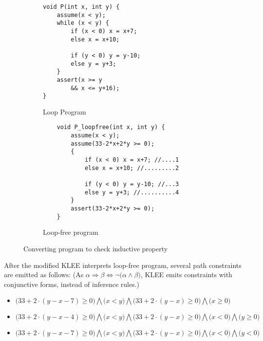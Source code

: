 \begin{figure}[!h]
\begin{subfigure}{0.20\textwidth}
    \centering
    {\scriptsize\begin{verbatim}
void P(int x, int y) {
    assume(x < y);
    while (x < y) {
        if (x < 0) x = x+7;
        else x = x+10;
    
        if (y < 0) y = y-10;
        else y = y+3; 
    }
    assert(x >= y
        && x <= y+16);
}
    \end{verbatim}}
    \vspace{-5mm}
    \caption{Loop Program}
    \label{fig:klee:program:in}
\end{subfigure}%
\begin{subfigure}{.20\textwidth}
      \centering
      \vspace{-0.1cm}
        {\scriptsize\begin{verbatim}
    void P_loopfree(int x, int y) {
        assume(x < y);
        assume(33-2*x+2*y >= 0);
        {
            if (x < 0) x = x+7; //....1
            else x = x+10; //.........2
    
            if (y < 0) y = y-10; //...3
            else y = y+3; //..........4
        }
        assert(33-2*x+2*y >= 0);
    }
    \end{verbatim}}
    \vspace{-5mm}
    \caption{Loop-free program}
      \label{fig:klee:program:out}
\end{subfigure}
\caption{Converting program to check inductive property}
\label{fig:klee:program}
\end{figure}

After the modified KLEE interprets loop-free program,
several path constraints are emitted as follows:
(As $\alpha \Rightarrow \beta \Longleftrightarrow \neg \big(\alpha \wedge \beta\big)$, 
KLEE emits constraints with conjunctive forms, instead of inference rules.)

\begin{itemize}
\item $\big(33+2\cdot(y-x-7)\ge0\big) \bigwedge \big(x<y\big) \bigwedge \big(33+2\cdot(y-x)\ge0\big) \bigwedge \big(x\ge0\big)$
\item $\big(33+2\cdot(y-x-4)\ge0\big) \bigwedge \big(x<y\big) \bigwedge \big(33+2\cdot(y-x)\ge0\big) \bigwedge \big(x<0\big) \bigwedge \big(y\ge0\big)$
\item $\big(33+2\cdot(y-x-7)\ge0\big) \bigwedge \big(x<y\big) \bigwedge \big(33+2\cdot(y-x)\ge0\big) \bigwedge \big(x<0\big) \bigwedge \big(y<0\big)$
\end{itemize}

